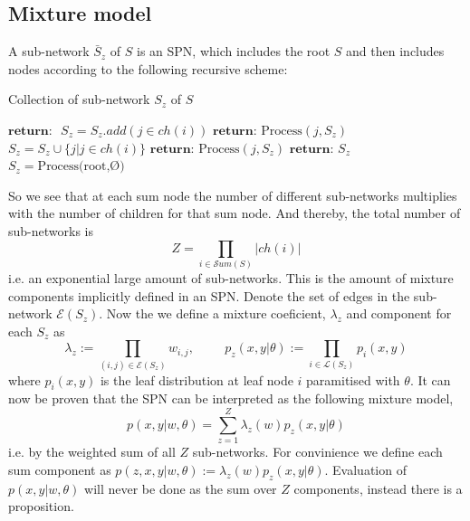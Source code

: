 \subsection*{Mixture model}
\begin{definition} 
    A sub-network $\bar S_z$ of $S$ is an SPN, which includes the root $S$ and then includes nodes
    according to the following recursive scheme: 
\end{definition}
\begin{algorithm}[H]
    \caption*{Collection of sub-network $S_z$ of $S$}\label{SPN4}
    \begin{algorithmic}
        \State  $\textbf{return: }$ 
    \EndIf
        \State $S_z =S_z.add(j \in ch(i))$ 
        \State $\textbf{return: } \text{Process}(j, S_z)$
    \EndIf
        \State $S_z =S_z \cup \{j | j \in ch(i)\}$ 
            \State $\textbf{return: } \text{Process}(j,S_z)$
        \EndFor
    \EndIf
    \State $\textbf{return: } S_z$
    \EndFunction
    \State $S_z =  \text{Process(root,Ø)}$
    \end{algorithmic}
\end{algorithm}
So we see that at each sum node the number of different sub-networks multiplies with the number of children for that
sum node. And thereby, the total number of sub-networks is
 $$Z = \prod_{i\in \mathcal{S}um(S)}|ch(i)|$$ 
 i.e. an exponential large amount of sub-networks. This is the amount of
 mixture components implicitly defined in an SPN. 
 Denote the set of edges in the sub-network $\mathcal{E}(S_z)$.
Now the we define a mixture coeficient, $\lambda_z$ and component for each $S_z$ as 
$$\lambda_z := \prod_{(i,j)\in \mathcal{E}(S_z)} w_{i,j}, \hspace{1cm}
p_z(x,y|\theta) := \prod_{i \in \mathcal{L}(S_z)} p_i(x,y)$$
where $p_i(x,y)$ is the leaf distribution at leaf node $i$ paramitised with $\theta$. 
It can now be proven that the SPN can be interpreted as the following mixture model, 
$$p(x,y|w,\theta) = \sum_{z=1}^Z \lambda_z(w)p_z(x,y|\theta)$$
i.e. by the weighted sum of all $Z$ sub-networks. For convinience
we define each sum component as $p(z,x,y|w,\theta) := \lambda_z(w)p_z(x,y|\theta)$.
Evaluation of $p(x,y|w,\theta)$ will never be done as the sum over $Z$ components, 
instead there is a proposition. 

